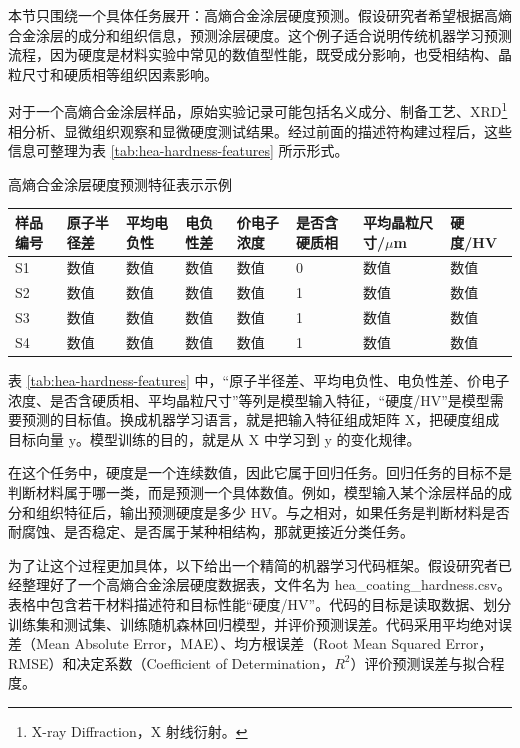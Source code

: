 本节只围绕一个具体任务展开：高熵合金涂层硬度预测。假设研究者希望根据高熵合金涂层的成分和组织信息，预测涂层硬度。这个例子适合说明传统机器学习预测流程，因为硬度是材料实验中常见的数值型性能，既受成分影响，也受相结构、晶粒尺寸和硬质相等组织因素影响。


对于一个高熵合金涂层样品，原始实验记录可能包括名义成分、制备工艺、XRD\footnote{X-ray Diffraction，X 射线衍射。} 相分析、显微组织观察和显微硬度测试结果。经过前面的描述符构建过程后，这些信息可整理为表 \ref{tab:hea-hardness-features} 所示形式。


\begin{formalTable}[htbp]
\caption{高熵合金涂层硬度预测特征表示示例}
\label{tab:hea-hardness-features}
\scriptsize
\setlength{\tabcolsep}{2.8pt}
\begin{tabularx}{\textwidth}{@{}YYYYYYYY@{}}
\toprule
\textbf{样品编号} & \textbf{原子半径差} & \textbf{平均电负性} & \textbf{电负性差} & \textbf{价电子浓度} & \textbf{是否含硬质相} & \textbf{平均晶粒尺寸/\(\mu\)m} & \textbf{硬度/HV} \\
\midrule
S1 & 数值 & 数值 & 数值 & 数值 & 0 & 数值 & 数值 \\
S2 & 数值 & 数值 & 数值 & 数值 & 1 & 数值 & 数值 \\
S3 & 数值 & 数值 & 数值 & 数值 & 1 & 数值 & 数值 \\
S4 & 数值 & 数值 & 数值 & 数值 & 1 & 数值 & 数值 \\
\bottomrule
\end{tabularx}
\end{formalTable}

表 \ref{tab:hea-hardness-features} 中，“原子半径差、平均电负性、电负性差、价电子浓度、是否含硬质相、平均晶粒尺寸”等列是模型输入特征，“硬度/HV”是模型需要预测的目标值。换成机器学习语言，就是把输入特征组成矩阵 X，把硬度组成目标向量 y。模型训练的目的，就是从 X 中学习到 y 的变化规律。


在这个任务中，硬度是一个连续数值，因此它属于回归任务。回归任务的目标不是判断材料属于哪一类，而是预测一个具体数值。例如，模型输入某个涂层样品的成分和组织特征后，输出预测硬度是多少 HV。与之相对，如果任务是判断材料是否耐腐蚀、是否稳定、是否属于某种相结构，那就更接近分类任务。


为了让这个过程更加具体，以下给出一个精简的机器学习代码框架。假设研究者已经整理好了一个高熵合金涂层硬度数据表，文件名为 hea\_\allowbreak{}coating\_\allowbreak{}hardness.csv。表格中包含若干材料描述符和目标性能“硬度/HV”。代码的目标是读取数据、划分训练集和测试集、训练随机森林回归模型，并评价预测误差。代码采用平均绝对误差（Mean Absolute Error，MAE）、均方根误差（Root Mean Squared Error，RMSE）和决定系数（Coefficient of Determination，\(R^2\)）评价预测误差与拟合程度。


